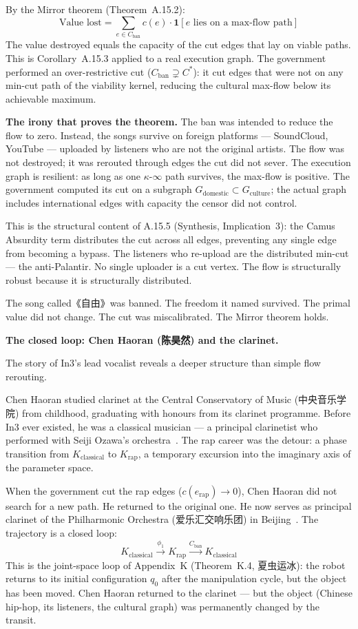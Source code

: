 \documentclass[11pt,a4paper]{article}
\theoremstyle{definition}
\theoremstyle{remark}
\begin{document}
By the Mirror theorem (Theorem~A.15.2):
\[
  \text{Value lost} = \sum_{e \in C_{\text{ban}}} c(e) \cdot \mathbf{1}[e \text{ lies on a max-flow path}]
\]
The value destroyed equals the capacity of the cut edges that lay on viable paths. This is Corollary~A.15.3 applied to a real execution graph. The government performed an over-restrictive cut ($C_{\text{ban}} \supsetneq C^*$): it cut edges that were not on any min-cut path of the viability kernel, reducing the cultural max-flow below its achievable maximum.

\textbf{The irony that proves the theorem.} The ban was intended to reduce the flow to zero. Instead, the songs survive on foreign platforms --- SoundCloud, YouTube --- uploaded by listeners who are not the original artists. The flow was not destroyed; it was rerouted through edges the cut did not sever. The execution graph is resilient: as long as one $\kappa$-$\infty$ path survives, the max-flow is positive. The government computed its cut on a subgraph $G_{\text{domestic}} \subset G_{\text{culture}}$; the actual graph includes international edges with capacity the censor did not control.

This is the structural content of A.15.5 (Synthesis, Implication~3): the Camus Absurdity term distributes the cut across all edges, preventing any single edge from becoming a bypass. The listeners who re-upload are the distributed min-cut --- the anti-Palantir. No single uploader is a cut vertex. The flow is structurally robust because it is structurally distributed.

The song called《自由》was banned. The freedom it named survived. The primal value did not change. The cut was miscalibrated. The Mirror theorem holds.

\bigskip
\noindent\textbf{The closed loop: Chen Haoran (陈昊然) and the clarinet.}

The story of In3's lead vocalist reveals a deeper structure than simple flow rerouting.

Chen Haoran studied clarinet at the Central Conservatory of Music (中央音乐学院) from childhood, graduating with honours from its clarinet programme. Before In3 ever existed, he was a classical musician --- a principal clarinetist who performed with Seiji Ozawa's orchestra~\cite{zhihu2022,in3wiki}. The rap career was the detour: a phase transition from $K_{\text{classical}}$ to $K_{\text{rap}}$, a temporary excursion into the imaginary axis of the parameter space.

When the government cut the rap edges ($c(e_{\text{rap}}) \to 0$), Chen Haoran did not search for a new path. He returned to the original one. He now serves as principal clarinet of the Philharmonic Orchestra (爱乐汇交响乐团) in Beijing~\cite{in3wiki}. The trajectory is a closed loop:
\[
  K_{\text{classical}} \xrightarrow{\phi_1} K_{\text{rap}} \xrightarrow{C_{\text{ban}}} K_{\text{classical}}
\]
This is the joint-space loop of Appendix~K (Theorem~K.4, 夏虫运冰): the robot returns to its initial configuration $q_0$ after the manipulation cycle, but the object has been moved. Chen Haoran returned to the clarinet --- but the object (Chinese hip-hop, its listeners, the cultural graph) was permanently changed by the transit.
\end{document}
